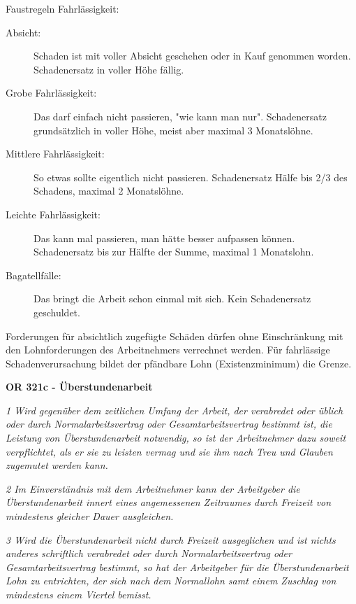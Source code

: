 Faustregeln Fahrlässigkeit:
\begin{description}
  \item[Absicht:] Schaden ist mit voller Absicht geschehen oder in Kauf genommen worden. Schadenersatz in voller Höhe fällig.
  \item[Grobe Fahrlässigkeit:] Das darf einfach nicht passieren, "wie kann man nur". Schadenersatz grundsätzlich in voller Höhe, meist aber maximal 3 Monatslöhne.
  \item[Mittlere Fahrlässigkeit:] So etwas sollte eigentlich nicht passieren. Schadenersatz Hälfe bis 2/3 des Schadens, maximal 2 Monatslöhne.
  \item[Leichte Fahrlässigkeit:] Das kann mal passieren, man hätte besser aufpassen können. Schadenersatz bis zur Hälfte der Summe, maximal 1 Monatslohn.
  \item[Bagatellfälle:] Das bringt die Arbeit schon einmal mit sich. Kein Schadenersatz geschuldet.     
\end{description}

Forderungen für absichtlich zugefügte Schäden dürfen ohne Einschränkung mit den Lohnforderungen des Arbeitnehmers verrechnet werden. Für fahrlässige Schadenverursachung bildet der pfändbare Lohn (Existenzminimum) die Grenze.
\vspace{3mm}

\textbf{OR 321c - Überstundenarbeit}

\textit{1 Wird gegenüber dem zeitlichen Umfang der Arbeit, der verabredet oder üblich oder durch Normalarbeitsvertrag oder Gesamtarbeitsvertrag bestimmt ist, die Leistung von Überstundenarbeit notwendig, so ist der Arbeitnehmer dazu soweit verpflichtet, als er sie zu leisten vermag und sie ihm nach Treu und Glauben zugemutet werden kann.}

\textit{2 Im Einverständnis mit dem Arbeitnehmer kann der Arbeitgeber die Überstundenarbeit innert eines angemessenen Zeitraumes durch Freizeit von mindestens gleicher Dauer ausgleichen.}

\textit{3 Wird die Überstundenarbeit nicht durch Freizeit ausgeglichen und ist nichts anderes schriftlich verabredet oder durch Normalarbeitsvertrag oder Gesamtarbeitsvertrag bestimmt, so hat der Arbeitgeber für die Überstundenarbeit Lohn zu entrichten, der sich nach dem Normallohn samt einem Zuschlag von mindestens einem Viertel bemisst.}

